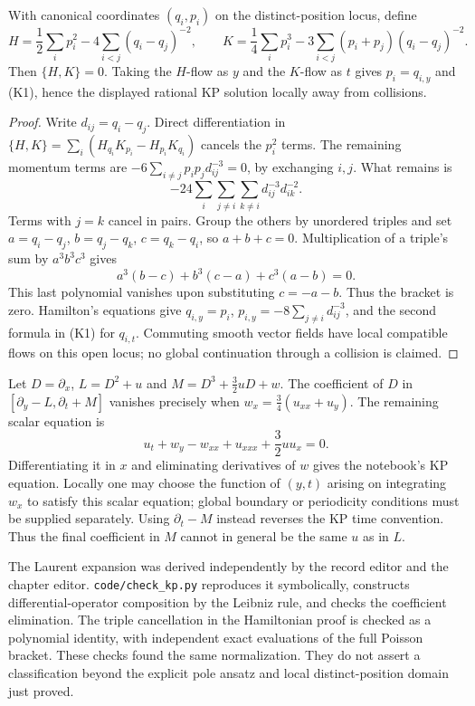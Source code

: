 \begin{proposition}\ours{}
With canonical coordinates \((q_i,p_i)\) on the distinct-position locus,
define
\[
 H=\frac12\sum_i p_i^2-4\sum_{i<j}(q_i-q_j)^{-2},\qquad
 K=\frac14\sum_i p_i^3-3\sum_{i<j}(p_i+p_j)(q_i-q_j)^{-2}.
 \tag{K2}
\]
Then \(\{H,K\}=0\). Taking the \(H\)-flow as \(y\) and the \(K\)-flow
as \(t\) gives \(p_i=q_{i,y}\) and (K1), hence the displayed rational KP
solution locally away from collisions.
\end{proposition}
\begin{proof}
Write \(d_{ij}=q_i-q_j\). Direct differentiation in
\(\{H,K\}=\sum_i(H_{q_i}K_{p_i}-H_{p_i}K_{q_i})\) cancels the
\(p_i^2\) terms. The remaining momentum terms are
\(-6\sum_{i\ne j}p_ip_jd_{ij}^{-3}=0\), by exchanging \(i,j\).
What remains is
\[
 -24\sum_i\sum_{j\ne i}\sum_{k\ne i}d_{ij}^{-3}d_{ik}^{-2}.
\]
Terms with \(j=k\) cancel in pairs. Group the others by unordered triples
and set \(a=q_i-q_j\), \(b=q_j-q_k\), \(c=q_k-q_i\), so
\(a+b+c=0\). Multiplication of a triple's sum by \(a^3b^3c^3\) gives
\[
 a^3(b-c)+b^3(c-a)+c^3(a-b)=0.
\]
This last polynomial vanishes upon substituting \(c=-a-b\). Thus the
bracket is zero. Hamilton's equations give
\(q_{i,y}=p_i\), \(p_{i,y}=-8\sum_{j\ne i}d_{ij}^{-3}\), and the
second formula in (K1) for \(q_{i,t}\). Commuting smooth vector fields have
local compatible flows on this open locus; no global continuation through
a collision is claimed.
\end{proof}

\begin{remark}\oursComputed{}
Let \(D=\partial_x\), \(L=D^2+u\) and
\(M=D^3+\frac32uD+w\). The coefficient of \(D\) in
\([\partial_y-L,\partial_t+M]\) vanishes precisely when
\(w_x=\frac34(u_{xx}+u_y)\). The remaining scalar equation is
\[
 u_t+w_y-w_{xx}+u_{xxx}+\frac32uu_x=0.
\]
Differentiating it in \(x\) and eliminating derivatives of \(w\) gives
the notebook's KP equation. Locally one may choose the function of
\((y,t)\) arising on integrating \(w_x\) to satisfy this scalar equation;
global boundary or periodicity conditions must be supplied separately.
Using \(\partial_t-M\) instead reverses the KP time convention. Thus the
final coefficient in \(M\) cannot in general be the same \(u\) as in \(L\).
\end{remark}

The Laurent expansion was derived independently by the record editor and
the chapter editor. \texttt{code/check\_kp.py} reproduces it symbolically,
constructs differential-operator composition by the Leibniz rule, and
checks the coefficient elimination. The triple cancellation in the
Hamiltonian proof is checked as a polynomial identity, with independent
exact evaluations of the full Poisson bracket. These checks found the
same normalization. They do not assert a classification beyond the
explicit pole ansatz and local distinct-position domain just proved.


